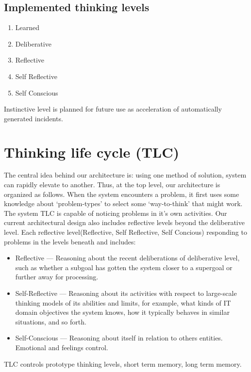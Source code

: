 \documentclass[runningheads,a4paper]{llncs}
\begin{document}
\subsection{Implemented thinking levels}

\begin{enumerate}
 \item Learned
 \item Deliberative
 \item Reflective
 \item Self Reflective
 \item Self Conscious
\end{enumerate}

Instinctive level is planned for future use as acceleration of automatically generated incidents.

\section{Thinking life cycle (TLC)}

The central idea behind our architecture is: using one method of solution, system can rapidly elevate to another. Thus, at the top level, our architecture is organized as follows. When the system encounters a problem, it first uses some knowledge about ‘problem-types’ to select some ‘way-to-think’ that might work. 
The system TLC is capable of noticing problems in it's own activities. Our current architectural design also includes reflective levels beyond the deliberative level. Each reflective level(Reflective, Self Reflective, Self Concious) responding to problems in the levels beneath and includes:
\begin{itemize}
 \item Reflective — Reasoning about the recent deliberations of deliberative level, such as whether a subgoal has gotten the system closer to a supergoal or further away for processing.
 \item Self-Reflective — Reasoning about its activities with respect to large-scale thinking models of its abilities and limits, for example, what kinds of  IT domain objectives  the system knows, how it typically behaves in similar situations, and so forth.
 \item Self-Conscious — Reasoning about itself in relation to others entities. Emotional and feelings control.
\end{itemize}

TLC controls prototype thinking levels, short term memory, long term memory.
\end{document}
